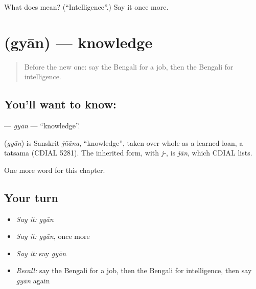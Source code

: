 \begin{tcolorbox}[breakable,colback=teal!4,colframe=teal!35!black,title={Before you move on}]
What does  mean? (\textquotedblleft{}Intelligence\textquotedblright{}.) Say it once more.
\end{tcolorbox}
\section[\texorpdfstring{\bn{জ্ঞান} (gyān)}{জ্ঞান (gyān)}]{ (gyān) — knowledge}

\label{lesson:BN-C99-gyan}



\begin{quote}
Before the new one: say the Bengali for a job, then the Bengali for intelligence.
\end{quote}

\subsection*{You'll want to know: }
\textbf{} — \emph{gyān} — \textquotedblleft{}knowledge\textquotedblright{}.

\begin{cousinweb}
\textbf{} (\emph{gyān}) is Sanskrit \emph{jñāna}, \textquotedblleft{}knowledge\textquotedblright{}, taken over whole as a learned loan, a tatsama (CDIAL 5281). The inherited form, with \emph{j-}, is \emph{jān}, which CDIAL lists.
\end{cousinweb}

\begin{grammarlens}[title={What you've built}]
One more word for this chapter.
\end{grammarlens}

\subsection*{Your turn}
\begin{itemize}
\raggedright
  \item \emph{Say it:} \emph{gyān}
  \item \emph{Say it:} \emph{gyān}, once more
  \item \emph{Say it:} say \emph{gyān}
  \item \emph{Recall:} say the Bengali for a job, then the Bengali for intelligence, then say \emph{gyān} again
\end{itemize}

